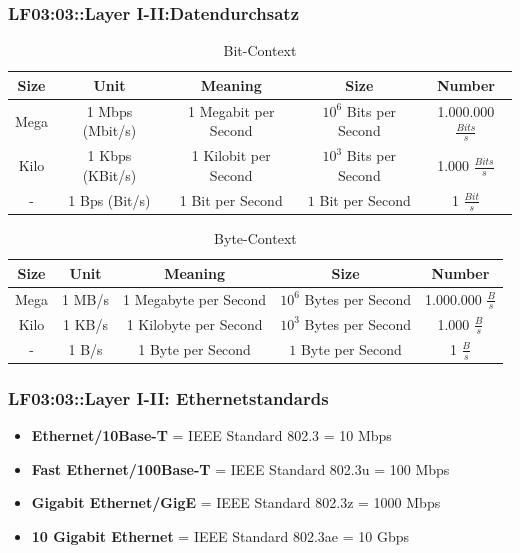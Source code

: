 \begin{frame}  
  \frametitle{LF03:03::Layer I-II:Datendurchsatz }

  \begin{tiny}
  \begin{center}
  \begin{table}
  \caption{Bit-Context}
  \renewcommand{\arraystretch}{1.5}
  \begin{tabular}{|c||c|c|c|c|}
    \hline
    Size & Unit & Meaning & Size & Number \\
    \hline
    \hline
    Mega & 1 Mbps (Mbit/s) & 1 Megabit per Second &  $10^6$ Bits per Second & 1.000.000 $\frac{Bits}{s}$\\
    \hline
    Kilo & 1 Kbps (KBit/s) & 1 Kilobit per Second &  $10^3$ Bits per Second & 1.000 $\frac{Bits}{s}$ \\
    \hline
     - & 1 Bps (Bit/s) & 1 Bit per Second &  $1$ Bit per Second & 1 $\frac{Bit}{s}$ \\
    \hline
  \end{tabular}
  \end{table}

  \vspace{0.4cm}
  \begin{table}
  \caption{Byte-Context}
  \renewcommand{\arraystretch}{1.5}
  \begin{tabular}{|c||c|c|c|c|}
    \hline
    Size & Unit & Meaning & Size & Number\\
    \hline
    \hline
    Mega & 1 MB/s & 1 Megabyte per Second & $10^6$ Bytes per Second & 1.000.000 $\frac{B}{s}$ \\
    \hline
    Kilo & 1 KB/s & 1 Kilobyte per Second & $10^3$ Bytes per Second & 1.000 $\frac{B}{s}$\\
    \hline
     - & 1 B/s & 1 Byte per Second &  $1$ Byte per Second & 1 $\frac{B}{s}$ \\
    \hline
  \end{tabular}  
\end{table}
  \end{center}
  \end{tiny}

\end{frame}


\begin{frame}  
  \frametitle{LF03:03::Layer I-II: Ethernetstandards }

  \begin{itemize}
    \item \textbf{Ethernet/10Base-T} = IEEE Standard 802.3 = 10 Mbps
    \item \textbf{Fast Ethernet/100Base-T} = IEEE Standard 802.3u = 100 Mbps
    \item \textbf{Gigabit Ethernet/GigE} = IEEE Standard 802.3z = 1000 Mbps
    \item \textbf{10 Gigabit Ethernet} = IEEE Standard 802.3ae = 10 Gbps
  \end{itemize}

\end{frame}


